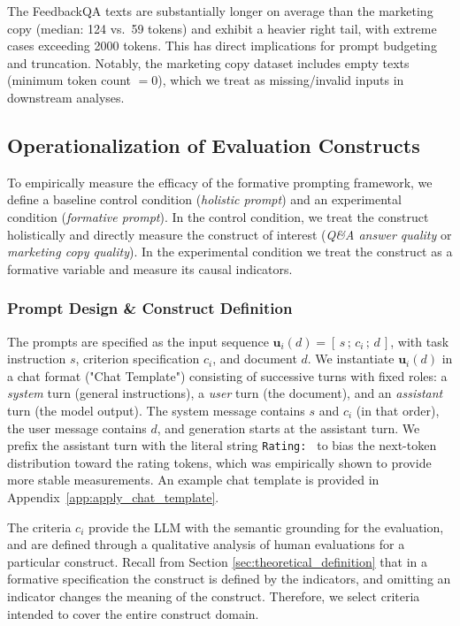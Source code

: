 The FeedbackQA texts are substantially longer on average than the marketing copy (median: 124 vs.\ 59 tokens) and exhibit a heavier right tail, with extreme cases exceeding 2000 tokens. This has direct implications for prompt budgeting and truncation. Notably, the marketing copy dataset includes empty texts (minimum token count $=0$), which we treat as missing/invalid inputs in downstream analyses.




\subsection{Operationalization of Evaluation Constructs}

To empirically measure the efficacy of the formative prompting framework, we define a baseline control condition (\textit{holistic prompt}) and an experimental condition (\textit{formative prompt}). In the control condition, we treat the construct holistically and directly measure the construct of interest (\textit{Q\&A answer quality} or \textit{marketing copy quality}). In the experimental condition we treat the construct as a formative variable and measure its causal indicators. 


\subsubsection{Prompt Design \& Construct Definition}\label{sec:prompt_design}

The prompts are specified as the input sequence $\mathbf{u}_i(d) = [\, s \,;\, c_i \,;\, d \,]$, with task instruction $s$, criterion specification $c_i$, and document $d$. We instantiate $\mathbf{u}_i(d)$ in a chat format ("Chat Template") consisting of successive turns with fixed roles: a \emph{system} turn (general instructions), a \emph{user} turn (the document), and an \emph{assistant} turn (the model output). The system message contains $s$ and $c_i$ (in that order), the user message contains $d$, and generation starts at the assistant turn. We prefix the assistant turn with the literal string \texttt{Rating: } to bias the next-token distribution toward the rating tokens, which was empirically shown to provide more stable measurements. An example chat template is provided in Appendix~\ref{app:apply_chat_template}.

The criteria $c_i$ provide the LLM with the semantic grounding for the evaluation, and are defined through a qualitative analysis of human evaluations for a particular construct. Recall from Section \ref{sec:theoretical_definition} that in a formative specification the construct is defined by the indicators, and omitting an indicator changes the meaning of the construct. Therefore, we select criteria intended to cover the entire construct domain.  

